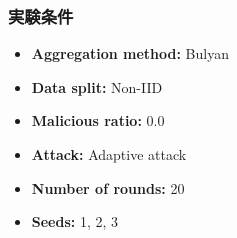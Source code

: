 \documentclass[a4j,twocolumn,dvipdfmx]{jsarticle}
\begin{document}
\subsubsection{実験条件}

\begin{itemize}
    \item \textbf{Aggregation method:} Bulyan
    \item \textbf{Data split:} Non-IID
    \item \textbf{Malicious ratio:} 0.0
    \item \textbf{Attack:} Adaptive attack
    \item \textbf{Number of rounds:} 20
    \item \textbf{Seeds:} 1, 2, 3
\end{itemize}

\end{document}
